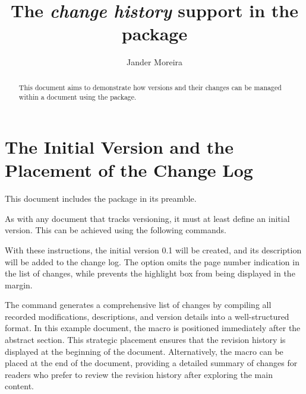 \documentclass[a4paper, 11pt]{article}
\title{The \textit{change history} support in the \PackageName{docs} package}
\author{Jander Moreira}
\date{}
\begin{document}
\maketitle

\begin{abstract}
    This document aims to demonstrate how versions and their changes can be managed within a document using the  package.
\end{abstract}

\begin{latexcode}
    \DocsPrintChanges
\end{latexcode}
\DocsPrintChanges


\section{The Initial Version and the Placement of the Change Log}

This document includes the  package in its preamble.

\begin{latexcode}
    \usepackage{docs}
\end{latexcode}

As with any document that tracks versioning, it must at least define an initial version. This can be achieved using the following commands.

%
\begin{latexcode}
\end{latexcode}

With these instructions, the initial version 0.1 will be created, and its description will be added to the change log. The  option omits the page number indication in the list of changes, while  prevents the highlight box from being displayed in the margin.

The  command generates a comprehensive list of changes by compiling all recorded modifications, descriptions, and version details into a well-structured format. In this example document, the macro is positioned immediately after the abstract section. This strategic placement ensures that the revision history is displayed at the beginning of the document. Alternatively, the macro can be placed at the end of the document, providing a detailed summary of changes for readers who prefer to review the revision history after exploring the main content.
\end{document}
